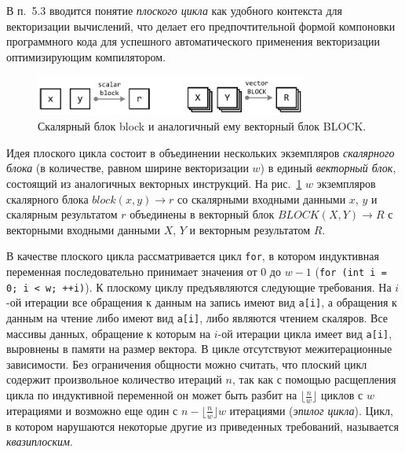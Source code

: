 \documentclass[a4paper,14pt]{extarticle}                     %
\theoremstyle{plain}                                         %
\begin{document}

В п.~5.3 вводится понятие \textit{плоского цикла} как удобного контекста для векторизации вычислений, что делает его предпочтительной формой компоновки программного кода для успешного автоматического применения векторизации оптимизирующим компилятором.

\begin{figure}[ht]
\centering
\includegraphics[width=0.8\textwidth]{./fig/vec_block_BLOCK.pdf}
\singlespacing
\caption{Скалярный блок block и аналогичный ему векторный блок BLOCK.}
\label{fig:vec_block_BLOCK}
\end{figure}

Идея плоского цикла состоит в объединении нескольких экземпляров \textit{скалярного блока} (в количестве, равном ширине векторизации $w$) в единый \textit{векторный блок}, состоящий из аналогичных векторных инструкций.
На рис.~\ref{fig:vec_block_BLOCK} $w$ экземпляров скалярного блока $block(x, y) \rightarrow r$ со скалярными входными данными $x$, $y$ и скалярным результатом $r$ объединены в векторный блок $BLOCK(X, Y) \rightarrow R$ с векторными входными данными $X$, $Y$ и векторным результатом $R$.

В качестве плоского цикла рассматривается цикл \texttt{for}, в котором индуктивная переменная последовательно принимает значения от $0$ до $w - 1$ (\texttt{for (int i = 0; i < w; ++i)}).
К плоскому циклу предъявляются следующие требования.
На $i$-ой итерации все обращения к данным на запись имеют вид \texttt{a[i]}, а обращения к данным на чтение либо имеют вид \texttt{a[i]}, либо являются чтением скаляров.
Все массивы данных, обращение к которым на $i$-ой итерации цикла имеет вид \texttt{a[i]}, выровнены в памяти на размер вектора.
В цикле отсутствуют межитерационные зависимости.
Без ограничения общности можно считать, что плоский цикл содержит произвольное количество итераций $n$, так как с помощью расщепления цикла по индуктивной переменной он может быть разбит на $\lfloor \frac{n}{w} \rfloor$ циклов с $w$ итерациями и возможно еще один с $n - \lfloor \frac{n}{w} \rfloor w$ итерациями (\textit{эпилог цикла}).
Цикл, в котором нарушаются некоторые другие из приведенных требований, называется \textit{квазиплоским}.
\end{document}

